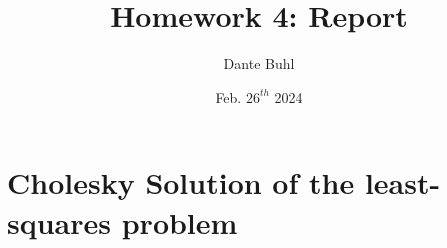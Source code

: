 \documentclass{article}
\title{Homework 4: Report}
\author{Dante Buhl}
\date{Feb. $26^{th}$ 2024}
\begin{document}
\newcommand{\bs}[1]{\boldsymbol{#1}}
\newcommand{\bmp}[1]{\begin{minipage}{#1\textwidth}}
\newcommand{\emp}{\end{minipage}}
\newcommand{\R}{\mathbb{R}}
\newcommand{\C}{\mathbb{C}}
\newcommand{\N}{\mathcal{N}}
\newcommand{\I}{\mathrm{I}}
\newcommand{\K}{\bs{\mathrm{K}}}
\newcommand{\m}{\bs{\mu}_*}
\newcommand{\s}{\bs{\Sigma}_*}
\newcommand{\dt}{\Delta t}
\newcommand{\tr}[1]{\text{Tr}(#1)}
\newcommand{\Tr}[1]{\text{Tr}(#1)}

\maketitle


\setcounter{section}{1}

\section{Cholesky Solution of the least-squares problem}
\end{document}
